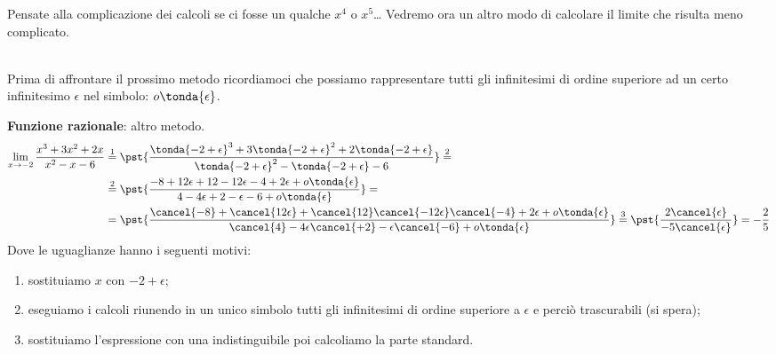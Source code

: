 \begin{osservazione}
Pensate alla complicazione dei calcoli se ci fosse un qualche \(x^4\) o
\(x^5\)\dots
Vedremo ora un altro modo di calcolare il limite che risulta meno 
complicato.
\end{osservazione}\\

Prima di affrontare il prossimo metodo ricordiamoci che possiamo 
rappresentare tutti gli infinitesimi di ordine superiore ad un certo 
infinitesimo \(\epsilon\) nel simbolo: \(o\tonda{\epsilon}\).

\begin{esempio}
\textbf{Funzione razionale}: altro metodo.
\begin{align*}
\lim_{x \rightarrow -2} \frac{x^3+3x^2+2x}{x^2-x-6} & \stackrel{1}{=} 
\pst{\frac
  {\tonda{-2+\epsilon}^3+3\tonda{-2+\epsilon}^2+2\tonda{-2+\epsilon}}
  {\tonda{-2+\epsilon}^2-\tonda{-2+\epsilon}-6}} \stackrel{2}{=}\\ 
  &\stackrel{2}{=}\pst{\frac{-8+12\epsilon+12-12\epsilon-4+2\epsilon+
                             o\tonda{\epsilon}}
                           {4-4\epsilon+2-\epsilon-6+o\tonda{\epsilon}
                           }}=\\ 
  &=\pst{\frac{\cancel{-8}+\cancel{12\epsilon}+
               \cancel{12}\cancel{-12\epsilon}\cancel{-4}+2\epsilon+
               o\tonda{\epsilon}}
              {\cancel{4}-4\epsilon\cancel{+2}-\epsilon\cancel{-6}+
               o\tonda{\epsilon}}}\stackrel{3}{=}
    \pst{\frac{2\cancel{\epsilon}}{-5\cancel{\epsilon}}} = -\frac{2}{5}
\end{align*}
Dove le uguaglianze hanno i seguenti motivi:
\begin{enumerate} [nosep]
 \item sostituiamo \(x\) con \(-2+\epsilon\);
 \item eseguiamo i calcoli riunendo in un unico simbolo tutti gli 
infinitesimi di ordine superiore a \(\epsilon\) e perciò trascurabili 
(si spera);
 \item sostituiamo l'espressione con una indistinguibile poi calcoliamo la 
parte standard.
\end{enumerate}
\end{esempio}

